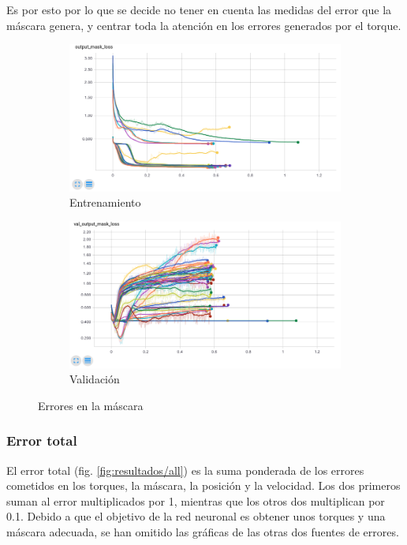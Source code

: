 Es por esto por lo que se decide no tener en cuenta las medidas del error que la máscara genera, y centrar toda la atención en los errores generados por el torque.

\begin{figure}[thb]
	\begin{subfigure}[b]{0.9\textwidth}
		\centering
		\includegraphics[width=\linewidth]{imagenes/resultados/mask_loss_all.png}
		\caption{Entrenamiento}
		\label{fig:resultados/mask_loss_all}
	\end{subfigure}
	\begin{subfigure}[b]{0.9\textwidth}
		\centering
		\includegraphics[width=\linewidth]{imagenes/resultados/val_mask_loss_all.png}
		\caption{Validación}
		\label{fig:resultados/val_mask_loss_all}
	\end{subfigure}
	\caption{Errores en la máscara}
	\label{fig:resultados/mask_all}
\end{figure}

\subsubsection{Error total}
El error total (fig. \ref{fig:resultados/all}) es la suma ponderada de los errores cometidos en los torques, la máscara, la posición y la velocidad. Los dos primeros suman al error multiplicados por 1, mientras que los otros dos multiplican por 0.1. Debido a que el objetivo de la red neuronal es obtener unos torques y una máscara adecuada, se han omitido las gráficas de las otras dos fuentes de errores.

